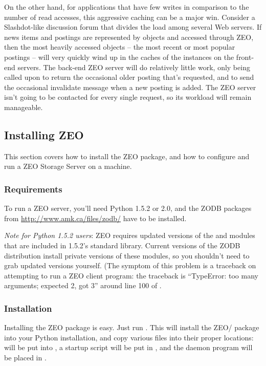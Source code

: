 On the other hand, for applications that have few writes in comparison
to the number of read accesses, this aggressive caching can be a major
win.  Consider a Slashdot-like discussion forum that divides the load
among several Web servers.  If news items and postings are represented
by objects and accessed through ZEO, then the most heavily accessed
objects -- the most recent or most popular postings -- will very
quickly wind up in the caches of the
 instances on the front-end servers.  The
back-end ZEO server will do relatively little work, only being called
upon to return the occasional older posting that's requested, and to
send the occasional invalidate message when a new posting is added.
The ZEO server isn't going to be contacted for every single request,
so its workload will remain manageable.

\subsection{Installing ZEO}

This section covers how to install the ZEO package, and how to 
configure and run a ZEO Storage Server on a machine. 

\subsubsection{Requirements}

To run a ZEO server, you'll need Python 1.5.2 or 2.0, and the ZODB
packages from \url{http://www.amk.ca/files/zodb/}
have to be installed.  

\emph{Note for Python 1.5.2 users}: ZEO requires updated versions
of the  and  modules that are
included in 1.5.2's standard library.  Current versions of the ZODB
distribution install private versions of these modules, so you
shouldn't need to grab updated versions yourself.  (The symptom of
this problem is a traceback on attempting to run a ZEO client program:
the traceback is ``TypeError: too many arguments; expected 2, got 3''
around line 100 of .

\subsubsection{Installation}

Installing the ZEO package is easy.  Just run .  This will install the ZEO/ package into your Python
installation, and copy various files into their proper locations:
 will be put into , a  startup
script will be put in , and the 
daemon program will be placed in .

